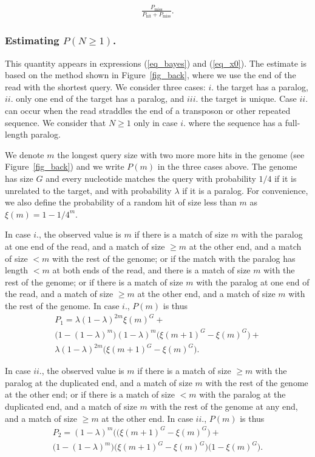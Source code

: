 \documentclass[a4,center,fleqn]{NAR}
\begin{document}
\begin{align}
\label{eq_low}
\frac{P_{\text{miss}}}{P_{\text{hit}} + P_{\text{miss}}}.
\end{align}

\subsubsection{Estimating $P(N \geq 1)$.} This quantity appears in
expressions (\ref{eq_bayes}) and (\ref{eq_x0}). The estimate is based on
the method shown in Figure~\ref{fig_back}, where we use the end of the
read with the shortest query. We consider three cases: $i.$ the target has
a paralog, $ii.$ only one end of the target has a paralog, and $iii.$ the
target is unique. Case $ii.$ can occur when the read straddles the end of
a transposon or other repeated sequence. We consider that $N \geq 1$ only
in case $i.$ where the sequence has a full-length paralog.

We denote $m$ the longest query size with two more more hits in the genome
(see Figure~\ref{fig_back}) and we write $P(m)$ in the three cases above.
The genome has size $G$ and every nucleotide matches the query with
probability $1/4$ if it is unrelated to the target, and with probability
$\lambda$ if it is a paralog. For convenience, we also define the
probability of a random hit of size less than $m$ as $\xi(m) = 1-1/4^m$.

In case $i.$, the observed value is $m$ if there is a match of size $m$
with the paralog at one end of the read, and a match of size $\geq m$ at
the other end, and a match of size $< m$ with the rest of the genome;
or if the match with the paralog has length $< m$ at both ends of the
read, and there is a match of size $m$ with the rest of the genome; or if
there is a match of size $m$ with the paralog at one end of the read, and
a match of size $\geq m$ at the other end, and a match of size $m$ with
the rest of the genome. In case $i.$, $P(m)$ is thus
\begin{align*}
P_1 = \lambda (1-\lambda)^{2m} \xi(m)^G + \\
\big(1-(1-\lambda)^m\big)(1-\lambda)^m \big(\xi(m+1)^G - \xi(m)^G\big) + \\
\lambda (1-\lambda)^{2m} \big(\xi(m+1)^G - \xi(m)^G\big).
\end{align*}

In case $ii.$, the observed value is $m$ if there is a match of size $\geq
m$ with the paralog at the duplicated end, and a match of size $m$ with
the rest of the genome at the other end; or if there is a match of size $<
m$ with the paralog at the duplicated end, and a match of size $m$ with
the rest of the genome at any end, and a match of size $\geq m$ at the
other end. In case $ii.$, $P(m)$ is thus
\begin{align*}
P_2 = (1-\lambda)^m \big((\xi(m+1)^G - \xi(m)^G\big) + \\
\big(1-(1-\lambda)^m\big) \big(\xi(m+1)^G - \xi(m)^G\big)
\big(1 - \xi(m)^G\big).
\end{align*}
\end{document}
